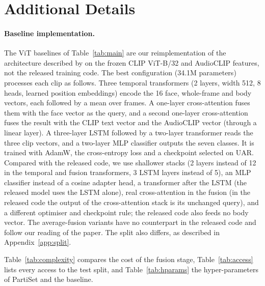 \documentclass[11pt]{article}
\newcommand{\model}{PartiSet}
\begin{document}


\appendix

\section{Additional Details}
\label{app:extra}

\paragraph{Baseline implementation.} The ViT baselines of Table~\ref{tab:main} are our reimplementation of the architecture
described by \citet{wang2026hief} on the frozen CLIP ViT-B/32 and AudioCLIP features, not the released training code. The
best configuration (34.1M parameters) processes each clip as follows. Three temporal transformers (2 layers, width 512,
8 heads, learned position embeddings) encode the 16 face, whole-frame and body vectors, each followed by a mean over
frames. A one-layer cross-attention fuses them with the face vector as the query, and a second one-layer cross-attention
fuses the result with the CLIP text vector and the AudioCLIP vector (through a linear layer). A three-layer LSTM followed
by a two-layer transformer reads the three clip vectors, and a two-layer MLP classifier outputs the seven classes. It is
trained with AdamW, the cross-entropy loss and a checkpoint selected on UAR. Compared with the released code, we use
shallower stacks (2 layers instead of 12 in the temporal and fusion transformers, 3 LSTM layers instead of 5), an MLP
classifier instead of a cosine adapter head, a transformer after the LSTM (the released model uses the LSTM alone), real
cross-attention in the fusion (in the released code the output of the cross-attention stack is its unchanged query), and
a different optimiser and checkpoint rule; the released code also feeds no body vector. The average-fusion variants have
no counterpart in the released code and follow our reading of the paper. The split also differs, as described in
Appendix~\ref{app:split}.

Table~\ref{tab:complexity} compares the cost of the fusion stage, Table~\ref{tab:access} lists every access to the test
split, and Table~\ref{tab:hparams} the hyper-parameters of \model{} and the baseline.
\end{document}
